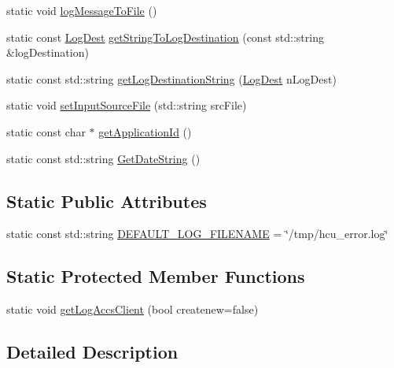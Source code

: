 \begin{DoxyCompactItemize}
\item 
static void \hyperlink{classutils_1_1Log_ac526c9aee25389e092ba27c5f5feb3e8}{log\+Message\+To\+File} ()
\item 
static const \hyperlink{classutils_1_1Log_aa77064096777fe92d4ff8f6d68d42d5a}{Log\+Dest} \hyperlink{classutils_1_1Log_a475ccc5ab88a7b288aaa89d67220c2b4}{get\+String\+To\+Log\+Destination} (const std\+::string \&log\+Destination)
\item 
static const std\+::string \hyperlink{classutils_1_1Log_a1b9c322df1f6e867cde069e02649df03}{get\+Log\+Destination\+String} (\hyperlink{classutils_1_1Log_aa77064096777fe92d4ff8f6d68d42d5a}{Log\+Dest} n\+Log\+Dest)
\item 
static void \hyperlink{classutils_1_1Log_a0d68bc67c1342672dc265bf16149b119}{set\+Input\+Source\+File} (std\+::string src\+File)
\item 
static const char $\ast$ \hyperlink{classutils_1_1Log_a56119815a8f43fdc9a7c942cdd29108b}{get\+Application\+Id} ()
\item 
static const std\+::string \hyperlink{classutils_1_1Log_ad34711830c35c8a91b61817a0669c4f8}{Get\+Date\+String} ()
\end{DoxyCompactItemize}
\subsection*{Static Public Attributes}
\begin{DoxyCompactItemize}
\item 
static const std\+::string \hyperlink{classutils_1_1Log_a887edb129af7794c19cf05ade96f892d}{D\+E\+F\+A\+U\+L\+T\+\_\+\+L\+O\+G\+\_\+\+F\+I\+L\+E\+N\+A\+ME} = \char`\"{}/tmp/hcu\+\_\+error.\+log\char`\"{}
\end{DoxyCompactItemize}
\subsection*{Static Protected Member Functions}
\begin{DoxyCompactItemize}
\item 
static void \hyperlink{classutils_1_1Log_afbdd825cb55cc5e13c08f347590debe9}{get\+Log\+Accs\+Client} (bool createnew=false)
\end{DoxyCompactItemize}


\subsection{Detailed Description}


